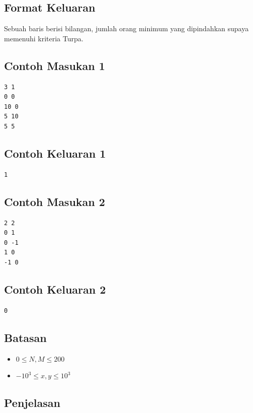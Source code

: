 \documentclass{article}
\begin{document}
\subsection*{Format Keluaran}

\par\noindent Sebuah baris berisi bilangan, jumlah orang minimum yang dipindahkan supaya memenuhi kriteria Turpa.

\subsection*{Contoh Masukan 1}

\begin{lstlisting}
3 1
0 0
10 0
5 10
5 5
\end{lstlisting}

\subsection*{Contoh Keluaran 1}

\begin{lstlisting}
1
\end{lstlisting}

\subsection*{Contoh Masukan 2}

\begin{lstlisting}
2 2
0 1
0 -1
1 0
-1 0
\end{lstlisting}

\subsection*{Contoh Keluaran 2}

\begin{lstlisting}
0
\end{lstlisting}

\subsection*{Batasan}

\begin{itemize}
  \item $0 \leq N,M \leq 200$
  \item $-10^3 \leq x, y \leq 10^3$
\end{itemize}

\subsection*{Penjelasan}
\end{document}
